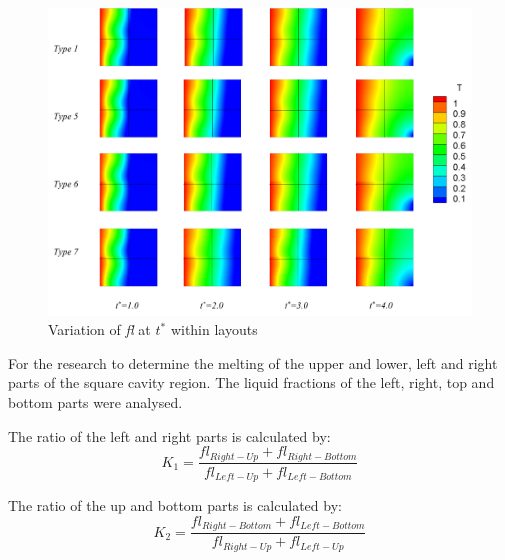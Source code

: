 \documentclass[preprint,12pt]{elsarticle}
\begin{document}
\begin{figure}[H]
	\centering
	\includegraphics[scale=0.4]{Fig/yun3.png}
	\caption{Variation of \textit{fl} at $ t^* $ within layouts}
	\label{Fig_yun3} 
\end{figure}
For the research to determine the melting of the upper and lower, left and right parts of the square cavity region.
The liquid fractions of  the left, right, top and bottom parts were analysed.

The ratio of the left and right parts is calculated by:
\begin{equation}
	K_1=\dfrac{fl_{Right-Up}+fl_{Right-	Bottom}}{fl_{Left-Up}+fl_{Left-Bottom}}
\end{equation}

The ratio of the up and bottom parts is calculated by:
\begin{equation}
	K_2=\dfrac{fl_{Right-	Bottom}+fl_{Left-Bottom}}{fl_{Right-Up}+fl_{Left-Up}}
\end{equation}
\end{document}
